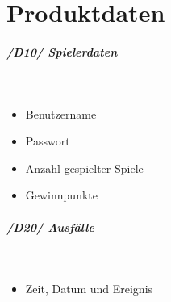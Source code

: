 \chapter{Produktdaten}

	\paragraph{/D10/ Spielerdaten}\hspace{1mm}\\
		\begin{itemize}
			\item Benutzername
		\end{itemize}
		
		\begin{itemize}
			\item Passwort
		\end{itemize}
		
		\begin{itemize}
			\item Anzahl gespielter Spiele
		\end{itemize}

		\begin{itemize}
			\item Gewinnpunkte
		\end{itemize}

	\paragraph{/D20/ Ausfälle}\hspace{1mm}\\
		\begin{itemize}
			\item Zeit, Datum und Ereignis
		\end{itemize}
